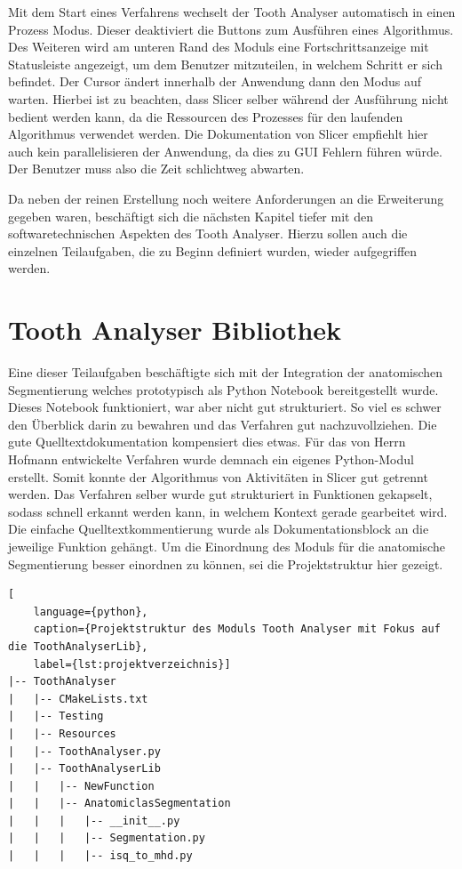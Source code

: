 Mit dem Start eines Verfahrens wechselt der Tooth Analyser automatisch in einen
Prozess Modus. Dieser deaktiviert die Buttons zum Ausführen eines Algorithmus.
Des Weiteren wird am unteren Rand des Moduls eine Fortschrittsanzeige mit
Statusleiste angezeigt, um dem Benutzer mitzuteilen, in welchem Schritt er sich
befindet. Der Cursor ändert innerhalb der Anwendung dann den Modus auf warten.
Hierbei ist zu beachten, dass Slicer selber während der Ausführung nicht bedient
werden kann, da die Ressourcen des Prozesses für den laufenden Algorithmus
verwendet werden. Die Dokumentation von Slicer empfiehlt hier auch kein parallelisieren
der Anwendung, da dies zu \ac{GUI} Fehlern führen würde. Der Benutzer muss also
die Zeit schlichtweg abwarten.

Da neben der reinen Erstellung noch weitere Anforderungen an die Erweiterung
gegeben waren, beschäftigt sich die nächsten Kapitel tiefer mit den softwaretechnischen
Aspekten des Tooth Analyser. Hierzu sollen auch die einzelnen Teilaufgaben, die zu
Beginn definiert wurden, wieder aufgegriffen werden.

\section{Tooth Analyser Bibliothek}
Eine dieser Teilaufgaben beschäftigte sich mit der Integration der anatomischen
Segmentierung welches prototypisch als Python Notebook bereitgestellt wurde. Dieses
Notebook funktioniert, war aber nicht gut strukturiert. So viel es schwer den Überblick
darin zu bewahren und das Verfahren gut nachzuvollziehen. Die gute
Quelltextdokumentation kompensiert dies etwas. Für das von Herrn Hofmann entwickelte
Verfahren wurde demnach ein eigenes Python-Modul erstellt. Somit konnte der
Algorithmus von Aktivitäten in Slicer gut getrennt werden. Das Verfahren selber wurde
gut strukturiert in Funktionen gekapselt, sodass schnell erkannt werden kann, in
welchem Kontext gerade gearbeitet wird. Die einfache Quelltextkommentierung
wurde als Dokumentationsblock an die jeweilige Funktion gehängt. Um die Einordnung
des Moduls für die anatomische Segmentierung besser einordnen zu können, sei die
Projektstruktur hier gezeigt.

\begin{lstlisting}[
    language={python},
    caption={Projektstruktur des Moduls Tooth Analyser mit Fokus auf die ToothAnalyserLib},
    label={lst:projektverzeichnis}]
|-- ToothAnalyser
|   |-- CMakeLists.txt
|   |-- Testing
|   |-- Resources
|   |-- ToothAnalyser.py
|   |-- ToothAnalyserLib
|   |   |-- NewFunction
|   |   |-- AnatomiclasSegmentation
|   |   |   |-- __init__.py
|   |   |   |-- Segmentation.py
|   |   |   |-- isq_to_mhd.py
\end{lstlisting}

